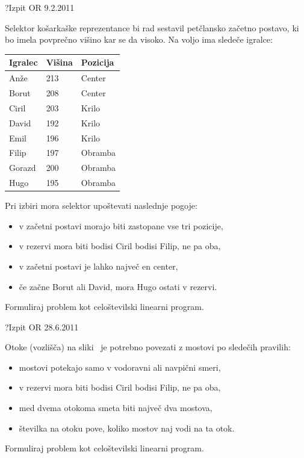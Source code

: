 \begin{naloga}{?}{Izpit OR 9.2.2011}
\begin{vprasanje}
Selektor košarkaške reprezentance bi rad sestavil petčlansko začetno postavo, ki bo imela povprečno
višino kar se da visoko. Na voljo ima sledeče igralce:
\begin{center}
\begin{tabular}{lll}
Igralec & Višina & Pozicija \\ \hline
Anže    & 213    & Center   \\
Borut   & 208    & Center   \\
Ciril   & 203    & Krilo    \\
David   & 192    & Krilo    \\
Emil    & 196    & Krilo    \\
Filip   & 197    & Obramba  \\
Gorazd  & 200    & Obramba  \\
Hugo    & 195    & Obramba  \\
\end{tabular}
\end{center}
Pri izbiri mora selektor upoštevati naslednje pogoje:
\begin{itemize}
\item v začetni postavi morajo biti zastopane vse tri pozicije,
\item v rezervi mora biti bodisi Ciril bodisi Filip, ne pa oba,
\item v začetni postavi je lahko največ en center,
\item če začne Borut ali David, mora Hugo ostati v rezervi.
\end{itemize}
Formuliraj problem kot celoštevilski linearni program.
\end{vprasanje}
\begin{odgovor}
\end{odgovor}
\end{naloga}


\begin{naloga}{?}{Izpit OR 28.6.2011}
\begin{vprasanje}[mostovi]
Otoke (vozlišča) na sliki~\fig{}
je potrebno povezati z mostovi po sledečih pravilih:
\begin{itemize}
\item mostovi potekajo samo v vodoravni ali navpični smeri,
\item v rezervi mora biti bodisi Ciril bodisi Filip, ne pa oba,
\item med dvema otokoma smeta biti največ dva mostova,
\item številka na otoku pove, koliko mostov naj vodi na ta otok.
\end{itemize}
Formuliraj problem kot celoštevilski linearni program.

\begin{slika}
\pgfslika
{}
\end{slika}
\end{vprasanje}
\begin{odgovor}
\end{odgovor}
\end{naloga}



